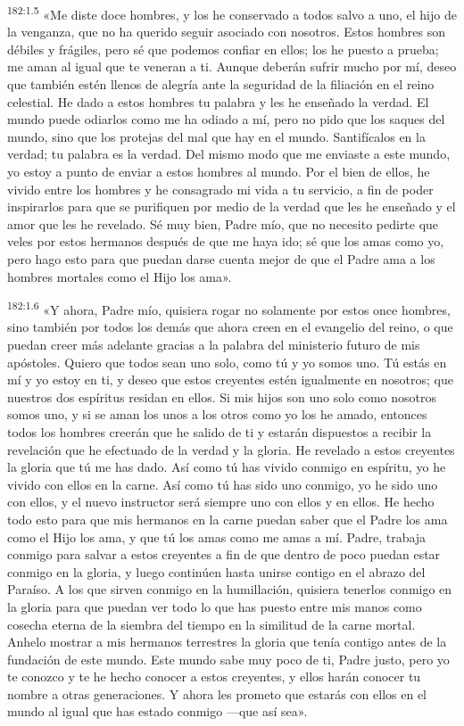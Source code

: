 \par 
\textsuperscript{182:1.5} «Me diste doce hombres, y los he conservado a todos salvo a uno, el hijo de la venganza, que no ha querido seguir asociado con nosotros. Estos hombres son débiles y frágiles, pero sé que podemos confiar en ellos; los he puesto a prueba; me aman al igual que te veneran a ti. Aunque deberán sufrir mucho por mí, deseo que también estén llenos de alegría ante la seguridad de la filiación en el reino celestial. He dado a estos hombres tu palabra y les he enseñado la verdad. El mundo puede odiarlos como me ha odiado a mí, pero no pido que los saques del mundo, sino que los protejas del mal que hay en el mundo. Santifícalos en la verdad; tu palabra es la verdad. Del mismo modo que me enviaste a este mundo, yo estoy a punto de enviar a estos hombres al mundo. Por el bien de ellos, he vivido entre los hombres y he consagrado mi vida a tu servicio, a fin de poder inspirarlos para que se purifiquen por medio de la verdad que les he enseñado y el amor que les he revelado. Sé muy bien, Padre mío, que no necesito pedirte que veles por estos hermanos después de que me haya ido; sé que los amas como yo, pero hago esto para que puedan darse cuenta mejor de que el Padre ama a los hombres mortales como el Hijo los ama».

\par 
\textsuperscript{182:1.6} «Y ahora, Padre mío, quisiera rogar no solamente por estos once hombres, sino también por todos los demás que ahora creen en el evangelio del reino, o que puedan creer más adelante gracias a la palabra del ministerio futuro de mis apóstoles. Quiero que todos sean uno solo, como tú y yo somos uno. Tú estás en mí y yo estoy en ti, y deseo que estos creyentes estén igualmente en nosotros; que nuestros dos espíritus residan en ellos. Si mis hijos son uno solo como nosotros somos uno, y si se aman los unos a los otros como yo los he amado, entonces todos los hombres creerán que he salido de ti y estarán dispuestos a recibir la revelación que he efectuado de la verdad y la gloria. He revelado a estos creyentes la gloria que tú me has dado. Así como tú has vivido conmigo en espíritu, yo he vivido con ellos en la carne. Así como tú has sido uno conmigo, yo he sido uno con ellos, y el nuevo instructor será siempre uno con ellos y en ellos. He hecho todo esto para que mis hermanos en la carne puedan saber que el Padre los ama como el Hijo los ama, y que tú los amas como me amas a mí. Padre, trabaja conmigo para salvar a estos creyentes a fin de que dentro de poco puedan estar conmigo en la gloria, y luego continúen hasta unirse contigo en el abrazo del Paraíso. A los que sirven conmigo en la humillación, quisiera tenerlos conmigo en la gloria para que puedan ver todo lo que has puesto entre mis manos como cosecha eterna de la siembra del tiempo en la similitud de la carne mortal. Anhelo mostrar a mis hermanos terrestres la gloria que tenía contigo antes de la fundación de este mundo. Este mundo sabe muy poco de ti, Padre justo, pero yo te conozco y te he hecho conocer a estos creyentes, y ellos harán conocer tu nombre a otras generaciones. Y ahora les prometo que estarás con ellos en el mundo al igual que has estado conmigo ---que así sea».

